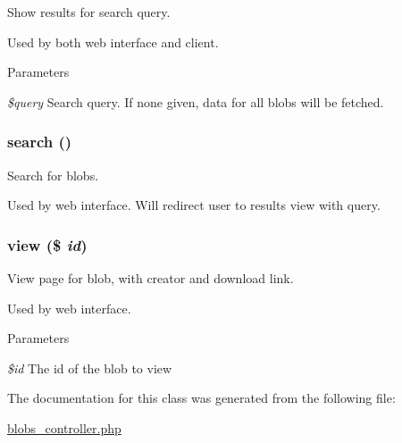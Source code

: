 Show results for search query. 

Used by both web interface and client. 
\begin{DoxyParams}{Parameters}
\item[{\em \$query}]Search query. If none given, data for all blobs will be fetched. \end{DoxyParams}
\hypertarget{class_blobs_controller_a796bf438724e047aeef18579732a3780}{
\subsubsection[{search}]{\setlength{\rightskip}{0pt plus 5cm}search ()}}
\label{class_blobs_controller_a796bf438724e047aeef18579732a3780}


Search for blobs. 

Used by web interface. Will redirect user to results view with query. \hypertarget{class_blobs_controller_a93a99cdd06e6a3044ed7e56db0f9419a}{
\subsubsection[{view}]{\setlength{\rightskip}{0pt plus 5cm}view (\$ {\em id})}}
\label{class_blobs_controller_a93a99cdd06e6a3044ed7e56db0f9419a}


View page for blob, with creator and download link. 

Used by web interface. 
\begin{DoxyParams}{Parameters}
\item[{\em \$id}]The id of the blob to view \end{DoxyParams}


The documentation for this class was generated from the following file:\begin{DoxyCompactItemize}
\item 
\hyperlink{blobs__controller_8php}{blobs\_\-controller.php}\end{DoxyCompactItemize}
